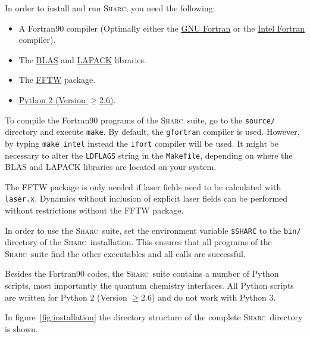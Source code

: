 \documentclass[a4paper,11pt,DIV=15,openany,twoside=false]{scrbook}
\newcommand{\sharc}{\textsc{Sharc}}
\newcommand{\ttt}[1]{\texttt{#1}}
\begin{document}
In order to install and run \sharc, you need the following:
\begin{itemize}
  \item A Fortran90 compiler (Optimally either the \href{https://gcc.gnu.org/fortran/}{GNU Fortran} or the \href{https://software.intel.com/en-us/fortran-compilers}{Intel Fortran} compiler).
  \item The \href{http://www.netlib.org/blas/}{BLAS} and \href{http://www.netlib.org/lapack/}{LAPACK} libraries.
  \item The \href{http://http://www.fftw.org/}{FFTW} package.
  \item \href{https://www.python.org/downloads/release/python-278/}{Python 2 (Version $\geq$2.6)}.
\end{itemize}

To compile the Fortran90 programs of the \sharc\ suite, go to the \ttt{source/} directory and execute \ttt{make}. By default, the \ttt{gfortran} compiler is used. However, by typing \ttt{make intel} instead the \ttt{ifort} compiler will be used. 
It might be necessary to alter the \ttt{LDFLAGS} string in the \ttt{Makefile}, depending on where the BLAS and LAPACK libraries are located on your system.

The FFTW package is only needed if laser fields need to be calculated with \ttt{laser.x}. Dynamics without inclusion of explicit laser fields can be performed without restrictions without the FFTW package.

In order to use the \sharc\ suite, set the environment variable \ttt{\$SHARC} to the \ttt{bin/} directory of the \sharc\ installation. This ensures that all programs of the \sharc\ suite find the other executables and all calls are successful.

Besides the Fortran90 codes, the \sharc\ suite contains a number of Python scripts, most importantly the quantum chemistry interfaces. All Python scripts are written for Python 2 (Version $\geq$2.6) and do not work with Python 3. 

In figure~\ref{fig:installation} the directory structure of the complete \sharc\ directory is shown.
\end{document}
